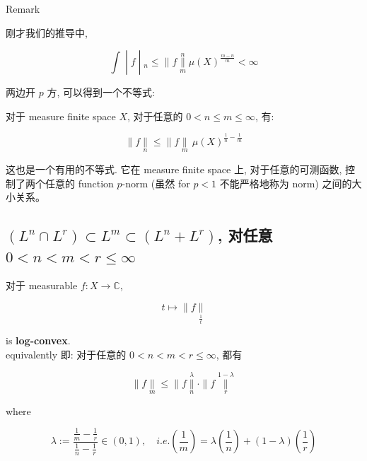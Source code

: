 \documentclass{qlnotes-export}
\begin{document}
\begin{qlremark}{Remark}

刚才我们的推导中,

\[\left. \int \middle| f \middle| {}_{n} \leq \parallel f\underset{m}{\overset{n}{\parallel}}\mu(X)^{\frac{m - n}{m}} < \infty \right.\]

两边开 \(p\) 方, 可以得到一个不等式:

\begin{theorem}\label{thm-09-l-p-space-and-inequalities-theorem-011}

对于 measure finite space \(X\), 对于任意的 \(0 < n \leq m \leq \infty\), 有:

\[\parallel f\underset{n}{\parallel} \leq \parallel f\underset{m}{\parallel}\,\mu(X)^{\frac{1}{n} - \frac{1}{m}}\]

\end{theorem}

这也是一个有用的不等式. 它在 measure finite space 上, 对于任意的可测函数, 控制了两个任意的 function \(p\)-norm (虽然 for \(p < 1\) 不能严格地称为 norm) 之间的大小关系。

\end{qlremark}

\subsection{\texorpdfstring{\((L^{n} \cap L^{r}) \subset L^{m} \subset (L^{n} + L^{r})\), 对任意 \(0 < n < m < r \leq \infty\)}{(L\^{}\{n\} \textbackslash cap L\^{}\{r\}) \textbackslash subset L\^{}\{m\} \textbackslash subset (L\^{}\{n\} + L\^{}\{r\}), 对任意 0 \textless{} n \textless{} m \textless{} r \textbackslash leq \textbackslash infty}}\label{ln-cap-lr-subset-lm-subset-ln-lr-ux5bf9ux4efbux610f-0-n-m-r-leq-infty}

\begin{proposition}\label{prop-09-l-p-space-and-inequalities-proposition-002}

对于 measurable \(f:X\rightarrow{\mathbb{C}}\),

\[t\mapsto \parallel f\underset{\frac{1}{t}}{\parallel}\]

is \textbf{log-convex}.\\
equivalently 即: 对于任意的 \(0 < n < m < r \leq \infty\), 都有

\[\parallel f\underset{m}{\parallel} \leq \parallel f\underset{n}{\overset{\lambda}{\parallel}} \cdot \parallel f\underset{r}{\overset{1 - \lambda}{\parallel}}\]

where

\[\lambda := \frac{\frac{1}{m} - \frac{1}{r}}{\frac{1}{n} - \frac{1}{r}} \in (0,1),\quad i.e.(\frac{1}{m}) = \lambda(\frac{1}{n}) + (1 - \lambda)(\frac{1}{r})\]

\end{proposition}
\end{document}

